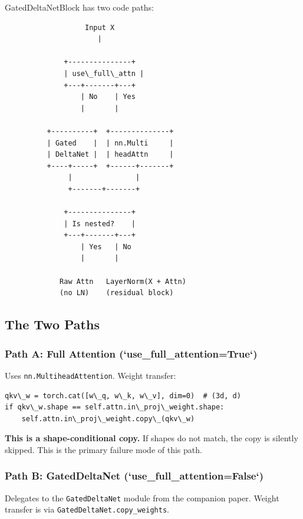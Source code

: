 GatedDeltaNetBlock has two code paths:

\begin{lstlisting}
                   Input X
                      |
                       
              +---------------+
              | use\_full\_attn |
              +---+-------+---+
                  | No    | Yes
                  |       |
                           
          +----------+  +--------------+
          | Gated    |  | nn.Multi     |
          | DeltaNet |  | headAttn     |
          +----+-----+  +------+-------+
               |               |
               +-------+-------+
                        
              +---------------+
              | Is nested?    |
              +---+-------+---+
                  | Yes   | No
                  |       |
                           
             Raw Attn   LayerNorm(X + Attn)
             (no LN)    (residual block)
\end{lstlisting}

\subsection{The Two Paths}

\subsubsection{Path A: Full Attention (`use\_full\_attention=True`)}

Uses \texttt{nn.MultiheadAttention}. Weight transfer:

\begin{lstlisting}
qkv\_w = torch.cat([w\_q, w\_k, w\_v], dim=0)  # (3d, d)
if qkv\_w.shape == self.attn.in\_proj\_weight.shape:
    self.attn.in\_proj\_weight.copy\_(qkv\_w)
\end{lstlisting}

\textbf{This is a shape-conditional copy.} If shapes do not match, the copy is 
silently skipped. This is the primary failure mode of this path.

\subsubsection{Path B: GatedDeltaNet (`use\_full\_attention=False`)}

Delegates to the \texttt{GatedDeltaNet} module from the companion paper. Weight 
transfer is via \texttt{GatedDeltaNet.copy\_weights}.

